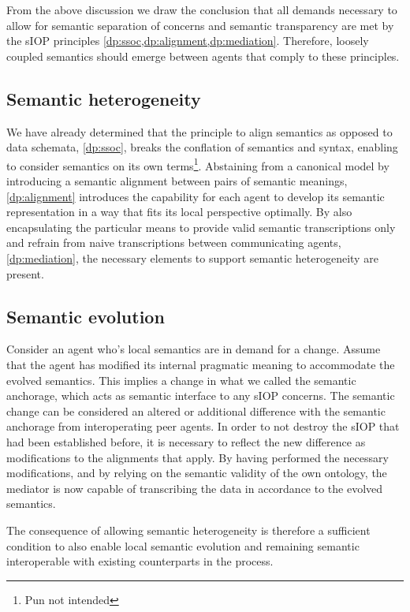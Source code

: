 \documentclass[sort&compress,preprint,authoryear,3p,twocolumn]{elsarticle}
\begin{document}
From the above discussion we draw the conclusion that all demands
necessary to allow for semantic separation of concerns and semantic
transparency are met by the sIOP principles
\cref{dp:ssoc,dp:alignment,dp:mediation}. Therefore, loosely coupled
semantics should emerge between agents that comply to these principles.

\hypertarget{semantic-heterogeneity-1}{%
\subsection{Semantic heterogeneity}\label{semantic-heterogeneity-1}}

We have already determined that the principle to align semantics as
opposed to data schemata, \cref{dp:ssoc}, breaks the conflation of
semantics and syntax, enabling to consider semantics on its own
terms\footnote{Pun not intended}. Abstaining from a canonical model by
introducing a semantic alignment between pairs of semantic meanings,
\cref{dp:alignment} introduces the capability for each agent to develop
its semantic representation in a way that fits its local perspective
optimally. By also encapsulating the particular means to provide valid
semantic transcriptions only and refrain from naive transcriptions
between communicating agents, \cref{dp:mediation}, the necessary
elements to support semantic heterogeneity are present.

\hypertarget{semantic-evolution}{%
\subsection{Semantic evolution}\label{semantic-evolution}}

Consider an agent who's local semantics are in demand for a change.
Assume that the agent has modified its internal pragmatic meaning to
accommodate the evolved semantics. This implies a change in what we
called the semantic anchorage, which acts as semantic interface to any
sIOP concerns. The semantic change can be considered an altered or
additional difference with the semantic anchorage from interoperating
peer agents. In order to not destroy the sIOP that had been established
before, it is necessary to reflect the new difference as modifications
to the alignments that apply. By having performed the necessary
modifications, and by relying on the semantic validity of the own
ontology, the mediator is now capable of transcribing the data in
accordance to the evolved semantics.

The consequence of allowing semantic heterogeneity is therefore a
sufficient condition to also enable local semantic evolution and
remaining semantic interoperable with existing counterparts in the
process.
\end{document}
